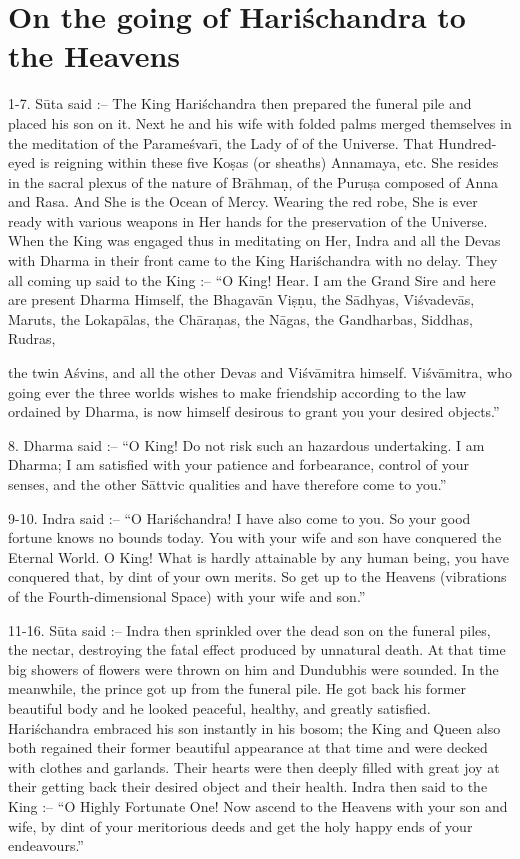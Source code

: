 \chapter{On the going of Hari\'schandra to the Heavens}

1-7. S\=uta said :-- The King Hari\'schandra then prepared the funeral pile and placed his son on it. Next he and his wife with folded palms merged themselves in the meditation of the Parame\'svar\={\i}, the Lady of of the Universe. That Hundred-eyed is reigning within these five Ko\d{s}as (or sheaths) Annamaya, etc. She resides in the sacral plexus of the nature of Br\=ahma\d{n}, of the Puru\d{s}a composed of Anna and Rasa. And She is the Ocean of Mercy. Wearing the red robe, She is ever ready with various weapons in Her hands for the preservation of the Universe. When the King was engaged thus in meditating on Her, Indra and all the Devas with Dharma in their front came to the King Hari\'schandra with no delay. They all coming up said to the King :-- ``O King! Hear. I am the Grand Sire and here are present Dharma Himself, the Bhagav\=an Vi\d{s}\d{n}u, the S\=adhyas, Vi\'svadev\=as, Maruts, the Lokap\=alas, the Ch\=ara\d{n}as, the N\=agas, the Gandharbas, Siddhas, Rudras,

the twin A\'svins, and all the other Devas and Vi\'sv\=amitra himself. Vi\'sv\=amitra, who going ever the three worlds wishes to make friendship according to the law ordained by Dharma, is now himself desirous to grant you your desired objects.''

8. Dharma said :-- ``O King! Do not risk such an hazardous undertaking. I am Dharma; I am satisfied with your patience and forbearance, control of your senses, and the other S\=attvic qualities and have therefore come to you.''

9-10. Indra said :-- ``O Hari\'schandra! I have also come to you. So your good fortune knows no bounds today. You with your wife and son have conquered the Eternal World. O King! What is hardly attainable by any human being, you have conquered that, by dint of your own merits. So get up to the Heavens (vibrations of the Fourth-dimensional Space) with your wife and son.''

11-16. S\=uta said :-- Indra then sprinkled over the dead son on the funeral piles, the nectar, destroying the fatal effect produced by unnatural death. At that time big showers of flowers were thrown on him and Dundubhis were sounded. In the meanwhile, the prince got up from the funeral pile. He got back his former beautiful body and he looked peaceful, healthy, and greatly satisfied. Hari\'schandra embraced his son instantly in his bosom; the King and Queen also both regained their former beautiful appearance at that time and were decked with clothes and garlands. Their hearts were then deeply filled with great joy at their getting back their desired object and their health. Indra then said to the King :-- ``O Highly Fortunate One! Now ascend to the Heavens with your son and wife, by dint of your meritorious deeds and get the holy happy ends of your endeavours.''

